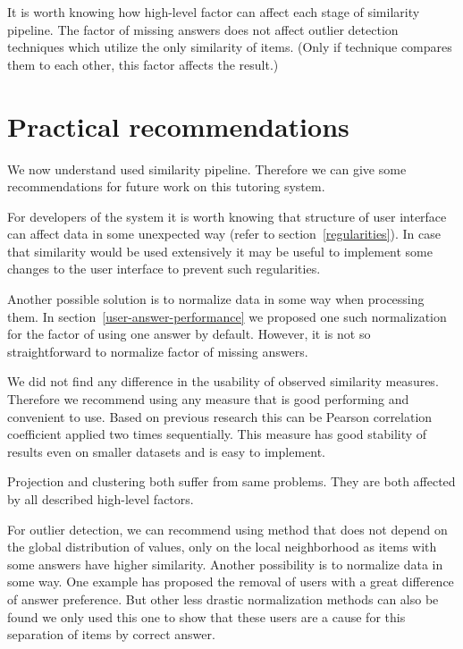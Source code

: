 \documentclass[
  printed, %
  table,   %
  nolof,     %
  nolot,     %
  color,
  final,
  nocover
]{fithesis3}
\begin{document}
It is worth knowing how high-level factor can affect each stage of similarity pipeline. The factor of missing answers does not affect outlier detection techniques which utilize the only similarity of items. (Only if technique compares them to each other, this factor affects the result.)


\section{Practical recommendations}\label{practical-recommendations}

We now understand used similarity pipeline. Therefore we can give some recommendations for future work on this tutoring system.


For developers of the system it is worth knowing that structure of user interface can affect data in some unexpected way (refer to section~\ref{regularities}). In case that similarity would be used extensively it may be useful to implement some changes to the user interface to prevent such regularities.


Another possible solution is to normalize data in some way when processing them. In section~\ref{user-answer-performance} we proposed one such normalization for the factor of using one answer by default. However, it is not so straightforward to normalize factor of missing answers.


We did not find any difference in the usability of observed similarity measures. Therefore we recommend using any measure that is good performing and convenient to use. Based on previous research this can be Pearson correlation coefficient applied two times sequentially. This measure has good stability of results even on smaller datasets and is easy to implement.


Projection and clustering both suffer from same problems. They are both affected by all described high-level factors.


For outlier detection, we can recommend using method that does not depend on the global distribution of values, only on the local neighborhood as items with some answers have higher similarity. Another possibility is to normalize data in some way. One example has proposed the removal of users with a great difference of answer preference. But other less drastic normalization methods can also be found we only used this one to show that these users are a cause for this separation of items by correct answer.
\end{document}
